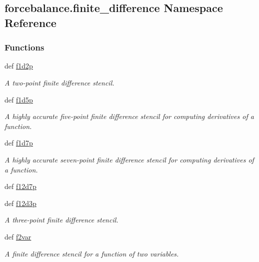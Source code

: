 \hypertarget{namespaceforcebalance_1_1finite__difference}{\subsection{forcebalance.\-finite\-\_\-difference Namespace Reference}
\label{namespaceforcebalance_1_1finite__difference}
}
\subsubsection*{Functions}
\begin{DoxyCompactItemize}
\item 
def \hyperlink{namespaceforcebalance_1_1finite__difference_ac5bb1552a9b8dd22c9c80e6444de2218}{f1d2p}
\begin{DoxyCompactList}\small\item\em A two-\/point finite difference stencil. \end{DoxyCompactList}\item 
def \hyperlink{namespaceforcebalance_1_1finite__difference_a123c5d5dea0f3f50ab57796bb3bc39be}{f1d5p}
\begin{DoxyCompactList}\small\item\em A highly accurate five-\/point finite difference stencil for computing derivatives of a function. \end{DoxyCompactList}\item 
def \hyperlink{namespaceforcebalance_1_1finite__difference_a9be9f0d21300958092e380514e2e980d}{f1d7p}
\begin{DoxyCompactList}\small\item\em A highly accurate seven-\/point finite difference stencil for computing derivatives of a function. \end{DoxyCompactList}\item 
def \hyperlink{namespaceforcebalance_1_1finite__difference_acc281f85b668062745f711d9b4a610fa}{f12d7p}
\item 
def \hyperlink{namespaceforcebalance_1_1finite__difference_aa69a8819e4680091f400303c1d6ddeb7}{f12d3p}
\begin{DoxyCompactList}\small\item\em A three-\/point finite difference stencil. \end{DoxyCompactList}\item 
def \hyperlink{namespaceforcebalance_1_1finite__difference_a25b9b661eb48d97d7ded70f4ccf50bbb}{f2var}
\begin{DoxyCompactList}\small\item\em A finite difference stencil for a function of two variables. \end{DoxyCompactList}\item 

\end{DoxyCompactItemize}
